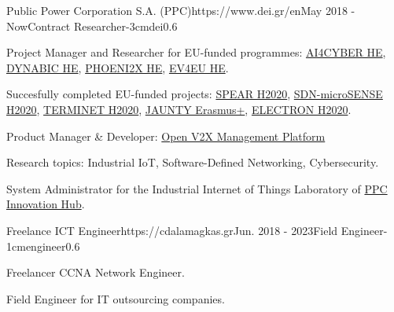 \documentclass{mycv}
\begin{document}
	\vspace*{0.5cm}
	
	\begin{EntryDatedLogo}{Public Power Corporation S.A. (PPC)}{https://www.dei.gr/en}{May 2018 - Now}{Contract Researcher}{-3cm}{dei}{0.6}
		\begin{Itemize}
			\item Project Manager and Researcher for EU-funded programmes: \href{https://cordis.europa.eu/project/id/101070450}{AI4CYBER HE}, \href{https://cordis.europa.eu/project/id/101070455}{DYNABIC HE}, \href{https://cordis.europa.eu/project/id/101070586}{PHOENI2X HE}, \href{https://cordis.europa.eu/project/id/101056765}{EV4EU HE}.
			\item Succesfully completed EU-funded projects: \href{https://cordis.europa.eu/project/id/787011}{SPEAR H2020}, \href{https://cordis.europa.eu/project/id/833955}{SDN-microSENSE H2020}, \href{https://cordis.europa.eu/project/id/957406}{TERMINET H2020}, \href{https://www.jaunty.eu/}{JAUNTY Erasmus+}, \href{https://cordis.europa.eu/project/id/101021936}{ELECTRON H2020}.
			\item Product Manager \& Developer: \href{https://github.com/EV4EU/ov2xmp}{Open V2X Management Platform} 
			\item Research topics: Industrial IoT, Software-Defined Networking, Cybersecurity.
			\item System Administrator for the Industrial Internet of Things Laboratory of \href{https://innovationhub.dei.gr/el/}{PPC Innovation Hub}.
		\end{Itemize}
	\end{EntryDatedLogo}
	
	\vspace*{0.5cm}
	
	\begin{EntryDatedLogo}{Freelance ICT Engineer}{https://cdalamagkas.gr}{Jun. 2018 - 2023}{Field Engineer}{-1cm}{engineer}{0.6}
		\begin{Itemize}
			\item Freelancer CCNA Network Engineer.
			\item Field Engineer for IT outsourcing companies.
		\end{Itemize}
	\end{EntryDatedLogo}

	\vspace*{0.5cm}	

\end{document}
